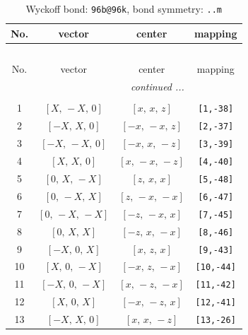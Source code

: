 \documentclass[fleqn,8pt]{jsarticle}
\begin{document}
\begin{longtable}{cccc}
\caption{Wyckoff bond: {\tt 96b@96k}, bond symmetry: {\tt ..m}}
 \\
 \hline \hline
No. & vector & center & mapping \\ \hline \endfirsthead

\multicolumn{3}{l}{\tablename\ \thetable{}} \\
 \hline \hline
No. & vector & center & mapping \\ \hline \endhead

 \hline \hline
\multicolumn{3}{r}{\footnotesize\it continued ...} \\ \endfoot

 \hline \hline
\multicolumn{3}{r}{} \\ \endlastfoot

1 & $\left[ X,\, - X,\, 0 \right]$ & $\left[ x,\, x,\, z \right]$ & {\tt [1,-38]} \\ \hline
2 & $\left[ - X,\, X,\, 0 \right]$ & $\left[ - x,\, - x,\, z \right]$ & {\tt [2,-37]} \\ \hline
3 & $\left[ - X,\, - X,\, 0 \right]$ & $\left[ - x,\, x,\, - z \right]$ & {\tt [3,-39]} \\ \hline
4 & $\left[ X,\, X,\, 0 \right]$ & $\left[ x,\, - x,\, - z \right]$ & {\tt [4,-40]} \\ \hline
5 & $\left[ 0,\, X,\, - X \right]$ & $\left[ z,\, x,\, x \right]$ & {\tt [5,-48]} \\ \hline
6 & $\left[ 0,\, - X,\, X \right]$ & $\left[ z,\, - x,\, - x \right]$ & {\tt [6,-47]} \\ \hline
7 & $\left[ 0,\, - X,\, - X \right]$ & $\left[ - z,\, - x,\, x \right]$ & {\tt [7,-45]} \\ \hline
8 & $\left[ 0,\, X,\, X \right]$ & $\left[ - z,\, x,\, - x \right]$ & {\tt [8,-46]} \\ \hline
9 & $\left[ - X,\, 0,\, X \right]$ & $\left[ x,\, z,\, x \right]$ & {\tt [9,-43]} \\ \hline
10 & $\left[ X,\, 0,\, - X \right]$ & $\left[ - x,\, z,\, - x \right]$ & {\tt [10,-44]} \\ \hline
11 & $\left[ - X,\, 0,\, - X \right]$ & $\left[ x,\, - z,\, - x \right]$ & {\tt [11,-42]} \\ \hline
12 & $\left[ X,\, 0,\, X \right]$ & $\left[ - x,\, - z,\, x \right]$ & {\tt [12,-41]} \\ \hline
13 & $\left[ - X,\, X,\, 0 \right]$ & $\left[ x,\, x,\, - z \right]$ & {\tt [13,-26]} \\ \hline

\end{longtable}
\end{document}
